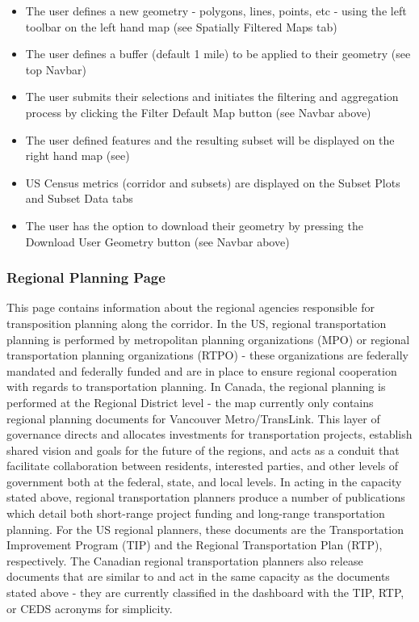 \documentclass[
]{article}
\providecommand{\tightlist}{%
  \setlength{\itemsep}{0pt}\setlength{\parskip}{0pt}}
\begin{document}
\begin{itemize}
\tightlist
\item
  The user defines a new geometry - polygons, lines, points, etc - using
  the left toolbar on the left hand map (see Spatially Filtered Maps
  tab)
\item
  The user defines a buffer (default 1 mile) to be applied to their
  geometry (see top Navbar)
\item
  The user submits their selections and initiates the filtering and
  aggregation process by clicking the Filter Default Map button (see
  Navbar above)
\item
  The user defined features and the resulting subset will be displayed
  on the right hand map (see)
\item
  US Census metrics (corridor and subsets) are displayed on the Subset
  Plots and Subset Data tabs
\item
  The user has the option to download their geometry by pressing the
  Download User Geometry button (see Navbar above)
\end{itemize}

\hypertarget{regional-planning-page}{%
\subsubsection{Regional Planning Page}\label{regional-planning-page}}

This page contains information about the regional agencies responsible
for transposition planning along the corridor. In the US, regional
transportation planning is performed by metropolitan planning
organizations (MPO) or regional transportation planning organizations
(RTPO) - these organizations are federally mandated and federally funded
and are in place to ensure regional cooperation with regards to
transportation planning. In Canada, the regional planning is performed
at the Regional District level - the map currently only contains
regional planning documents for Vancouver Metro/TransLink. This layer of
governance directs and allocates investments for transportation
projects, establish shared vision and goals for the future of the
regions, and acts as a conduit that facilitate collaboration between
residents, interested parties, and other levels of government both at
the federal, state, and local levels. In acting in the capacity stated
above, regional transportation planners produce a number of publications
which detail both short-range project funding and long-range
transportation planning. For the US regional planners, these documents
are the Transportation Improvement Program (TIP) and the Regional
Transportation Plan (RTP), respectively. The Canadian regional
transportation planners also release documents that are similar to and
act in the same capacity as the documents stated above - they are
currently classified in the dashboard with the TIP, RTP, or CEDS
acronyms for simplicity.
\end{document}
